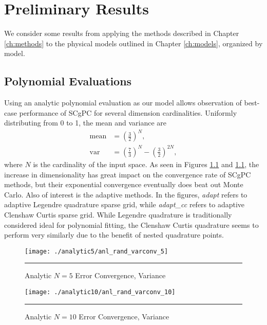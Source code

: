 
\chapter{Preliminary Results} %

\label{ch:results} %


We consider some results from applying the methods described in Chapter \ref{ch:methods} to the physical
models outlined in Chapter \ref{ch:models}, organized by model.

\section{Polynomial Evaluations}
Using an analytic polynomial evaluation as our model allows observation of best-case performance of SCgPC for
several dimension cardinalities.  Uniformly distributing from 0 to 1, the mean and variance are
\begin{align}
  \text{mean}&=\left(\frac{3}{2}\right)^N,\\
  \text{var}&=\left(\frac{7}{3}\right)^N-\left(\frac{3}{2}\right)^{2N},
\end{align}
where $N$ is the cardinality of the input space.  As seen in Figures \ref{fig:anl5_varconv} and
\ref{fig:anl5_varconv}, the increase in dimensionality has great impact on the convergence rate of SCgPC
methods, but their exponential convergence eventually does beat out Monte Carlo.  Also of interest is the
adaptive methods.  In the figures, \emph{adapt} refers to adaptive Legendre quadrature sparse grid, while
\emph{adapt\_cc} refers to adaptive Clenshaw Curtis sparse grid.  While Legendre quadrature is traditionally
considered ideal for polynomial fitting, the Clenshaw Curtis quadrature seems to perform very similarly due to
the benefit of nested quadrature points.

\begin{figure}[H]
  \centering
    \texttt{[image: ./analytic5/anl\_rand\_varconv\_5]}
    \rule{35em}{0.5pt}
  \caption{Analytic $N=5$ Error Convergence, Variance}
  \label{fig:anl5_varconv}
\end{figure}
\begin{figure}[H]
  \centering
    \texttt{[image: ./analytic10/anl\_rand\_varconv\_10]}
    \rule{35em}{0.5pt}
  \caption{Analytic $N=10$ Error Convergence, Variance}
  \label{fig:anl10_varconv}
\end{figure}



